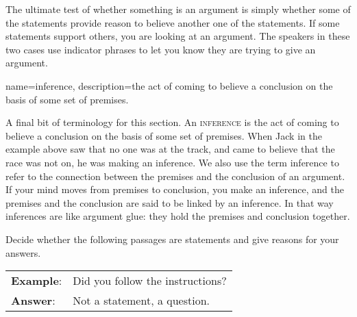 The ultimate test of whether something is an argument is simply whether some of the statements provide reason to believe another one of the statements. If some statements support others, you are looking at an argument. The speakers in these two cases use indicator phrases to let you know they are trying to give an argument.

{
name=inference,
description={the act of coming to believe a conclusion on the basis of some set of premises.}
}

A final bit of terminology for this section. An \textsc{\gls{inference}} \label{def:Inference} is the act of coming to believe a conclusion on the basis of some set of premises. When Jack in the example above saw that no one was at the track, and came to believe that the race was not on, he was making an inference. We also use the term inference to refer to the connection between the premises and the conclusion of an argument. If your mind moves from premises to conclusion, you make an inference, and the premises and the conclusion are said to be linked by an inference. In that way inferences are like argument glue: they hold the premises and conclusion together. 



\practiceproblems

\noindent\problempart Decide whether the following passages are statements and give reasons for your answers.

\begin{longtabu}{p{.1\linewidth}p{.9\linewidth}}
\textbf{Example}: & Did you follow the instructions? \\
\textbf{Answer}: & Not a statement, a question. \\
\end{longtabu}


